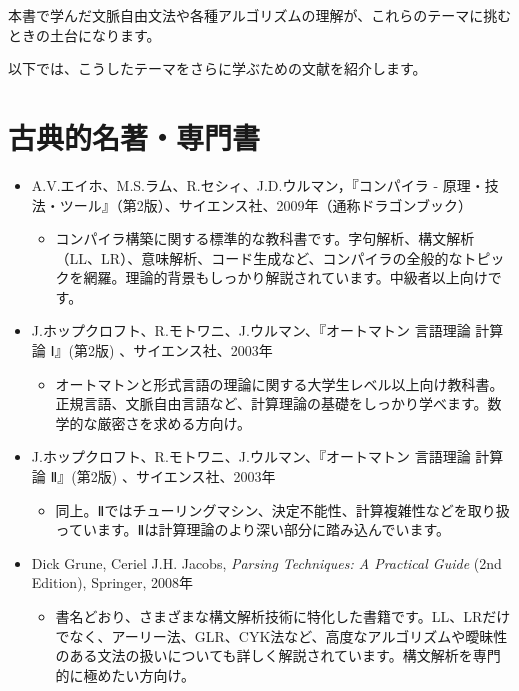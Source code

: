 本書で学んだ文脈自由文法や各種アルゴリズムの理解が、これらのテーマに挑むときの土台になります。

以下では、こうしたテーマをさらに学ぶための文献を紹介します。

\section*{古典的名著・専門書}\label{a.1}

\begin{itemize}
\item
  A.V.エイホ、M.S.ラム、R.セシィ、J.D.ウルマン，『コンパイラ -
  原理・技法・ツール』（第2版）、サイエンス社、2009年（通称ドラゴンブック）

  \begin{itemize}
  \item
    コンパイラ構築に関する標準的な教科書です。字句解析、構文解析（LL、LR）、意味解析、コード生成など、コンパイラの全般的なトピックを網羅。理論的背景もしっかり解説されています。中級者以上向けです。
  \end{itemize}
\item
  J.ホップクロフト、R.モトワニ、J.ウルマン、『オートマトン 言語理論 計算論 Ⅰ』(第2版)
  、サイエンス社、2003年

  \begin{itemize}
  \item
    オートマトンと形式言語の理論に関する大学生レベル以上向け教科書。正規言語、文脈自由言語など、計算理論の基礎をしっかり学べます。数学的な厳密さを求める方向け。
  \end{itemize}
\item
  J.ホップクロフト、R.モトワニ、J.ウルマン、『オートマトン 言語理論 計算論 Ⅱ』(第2版)
  、サイエンス社、2003年

  \begin{itemize}
  \item
    同上。Ⅱではチューリングマシン、決定不能性、計算複雑性などを取り扱っています。Ⅱは計算理論のより深い部分に踏み込んでいます。
  \end{itemize}
\item
  Dick Grune, Ceriel J.H. Jacobs, \emph{Parsing Techniques: A Practical
  Guide} (2nd Edition), Springer, 2008年

  \begin{itemize}
  \item
    \enlargethispage{\baselineskip}書名どおり、さまざまな構文解析技術に特化した書籍です。LL、LRだけでなく、アーリー法、GLR、CYK法など、高度なアルゴリズムや曖昧性のある文法の扱いについても詳しく解説されています。構文解析を専門的に極めたい方向け。
  \end{itemize}
\end{itemize}

